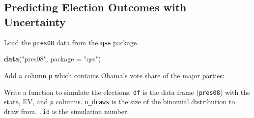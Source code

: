 \documentclass[]{book}
\newenvironment{Shaded}{\begin{snugshade}}{\end{snugshade}}
\newcommand{\KeywordTok}[1]{\textcolor[rgb]{0.13,0.29,0.53}{\textbf{#1}}}
\newcommand{\DataTypeTok}[1]{\textcolor[rgb]{0.13,0.29,0.53}{#1}}
\newcommand{\DecValTok}[1]{\textcolor[rgb]{0.00,0.00,0.81}{#1}}
\newcommand{\StringTok}[1]{\textcolor[rgb]{0.31,0.60,0.02}{#1}}
\newcommand{\CommentTok}[1]{\textcolor[rgb]{0.56,0.35,0.01}{\textit{#1}}}
\newcommand{\ControlFlowTok}[1]{\textcolor[rgb]{0.13,0.29,0.53}{\textbf{#1}}}
\newcommand{\OperatorTok}[1]{\textcolor[rgb]{0.81,0.36,0.00}{\textbf{#1}}}
\newcommand{\NormalTok}[1]{#1}
\theoremstyle{definition}
\theoremstyle{definition}
\theoremstyle{definition}
\theoremstyle{remark}
\begin{document}
\subsection{Predicting Election Outcomes with
Uncertainty}\label{predicting-election-outcomes-with-uncertainty}

Load the \texttt{pres08} data from the \textbf{qss} package.

\begin{Shaded}
\begin{Highlighting}[]
\KeywordTok{data}\NormalTok{(}\StringTok{"pres08"}\NormalTok{, }\DataTypeTok{package =} \StringTok{"qss"}\NormalTok{)}
\end{Highlighting}
\end{Shaded}

Add a column \texttt{p} which contains Obama's vote share of the major
parties:

\begin{Shaded}
\end{Shaded}

Write a function to simulate the elections. \texttt{df} is the data
frame (\texttt{pres08}) with the state, EV, and \texttt{p} columns.
\texttt{n\_draws} is the size of the binomial distribution to draw from.
\texttt{.id} is the simulation number.

\begin{Shaded}
\end{Shaded}
\end{document}
